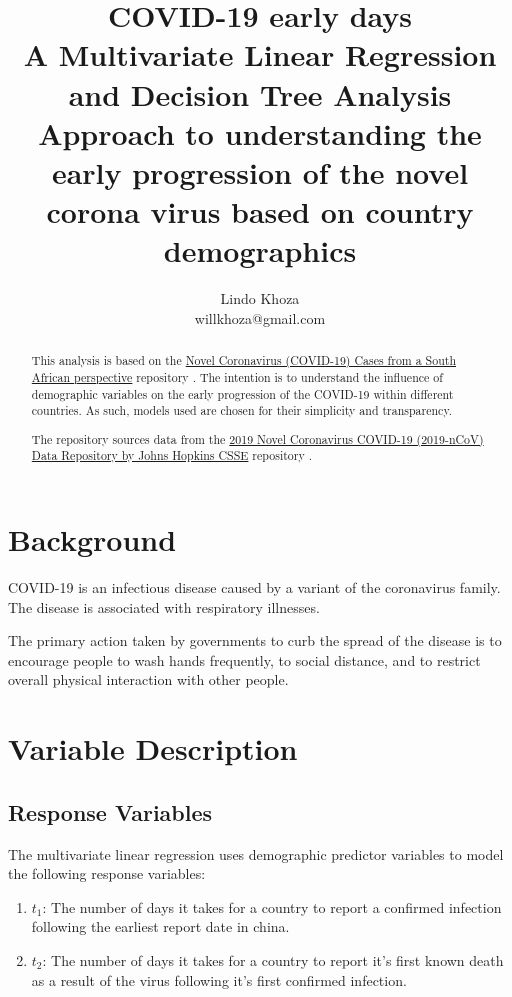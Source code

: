 \documentclass[]{report}
\title{COVID-19 early days \\ \large A Multivariate Linear Regression and Decision Tree Analysis \\ Approach to understanding the early progression of the novel corona virus based on country demographics}
\author{Lindo Khoza \\ willkhoza@gmail.com}
\begin{document}
\maketitle

\begin{abstract}
This analysis is based on the \href{https://github.com/willkhoza/COVID_SA}{Novel Coronavirus (COVID-19) Cases from a South African perspective} repository \cite{covidsa}. The intention is to understand the influence of demographic variables on the early progression of the COVID-19 within different countries. As such, models used are chosen for their simplicity and transparency.

The repository sources data from the \href{https://github.com/CSSEGISandData/COVID-19}{2019 Novel Coronavirus COVID-19 (2019-nCoV) Data Repository by Johns Hopkins CSSE} repository \cite{jhu}.
\end{abstract}

\section*{Background}

COVID-19 is an infectious disease caused by a variant of the coronavirus family. The disease is associated with respiratory illnesses.

The primary action taken by governments to curb the spread of the disease is to encourage people to wash hands frequently, to social distance, and to restrict overall physical interaction with other people.

\section{Variable Description}

\subsection{Response Variables}

The multivariate linear regression uses demographic predictor variables to model the following response variables:


\begin{enumerate}
	\item $t_1$: The number of days it takes for a country to report a confirmed infection following the earliest report date in china.
	\item $t_2$: The number of days it takes for a country to report it's first known death as a result of the virus following it's first confirmed infection.
\end{enumerate}
\end{document}
